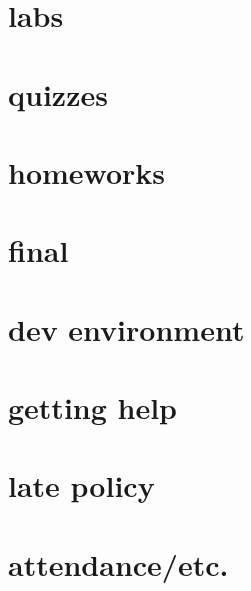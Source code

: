 

\section{labs}


\section{quizzes}


\section{homeworks}


\section{final}


\section{dev environment}


\section{getting help}


\section{late policy}


\section{attendance/etc.}

